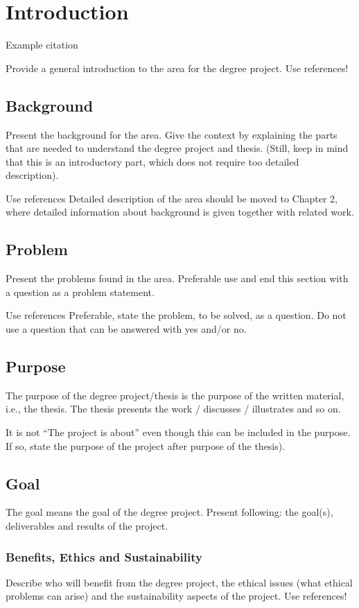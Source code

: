 \section{Introduction }

Example citation \cite{Jones2017}

Provide a general introduction to the area for the degree project. Use references!

\subsection{Background}
Present the background for the area. Give the context by explaining the parts that are needed to understand the degree project and thesis. (Still, keep in mind that this is an introductory part, which does not require too detailed description).

Use references
Detailed description of the area should be moved to Chapter 2, where detailed information about background is given together with related work. 

\subsection{Problem}
Present the problems found in the area. Preferable use and end this section with a question as a problem statement.

Use references
Preferable, state the problem, to be solved, as a question. Do not use a question that can be answered with yes and/or no. 

\subsection{Purpose}
The purpose of the degree project/thesis is the purpose of the written material, i.e., the thesis. The thesis presents the work / discusses / illustrates and so on.

It is not “The project is about” even though this can be included in the purpose. If so, state the purpose of the project after purpose of the thesis).

\subsection{Goal}
The goal means the goal of the degree project. Present following: the goal(s), deliverables and results of the project. 

\subsubsection{Benefits, Ethics and Sustainability}
Describe who will benefit from the degree project, the ethical issues (what ethical problems can arise) and the sustainability aspects of the project.
Use references!

